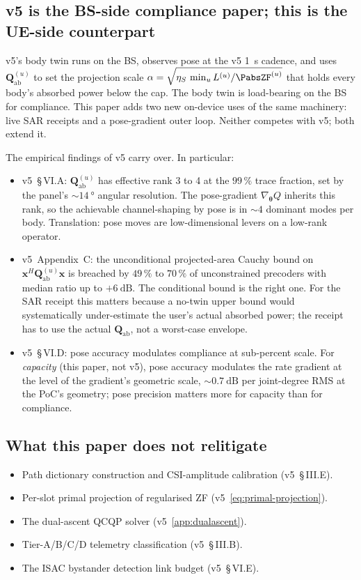 \documentclass[11pt,a4paper]{article}
\theoremstyle{definition}
\newcommand{\Qabs}{\mathbf{Q}_{\mathrm{ab}}}
\newcommand{\xvec}{\mathbf{x}}
\newcommand{\thetab}{\bm{\theta}}
\begin{document}
\subsection{v5 is the BS-side compliance paper; this is the UE-side
counterpart}

v5's body twin runs on the BS, observes pose at the v5 \SI{1}{\s}
cadence, and uses $\Qabs^{(u)}$ to set the projection scale
$\alpha=\sqrt{\eta_S\,\min_u L^{(u)}/\PabsZF^{(u)}}$ that holds
every body's absorbed power below the cap.  The body twin is
load-bearing on the BS for compliance.  This paper adds two new
on-device uses of the same machinery: live SAR receipts and a
pose-gradient outer loop.  Neither competes with v5; both extend
it.

The empirical findings of v5 carry over.  In particular:
\begin{itemize}[leftmargin=1.6em,itemsep=2pt]
\item v5~\S\,VI.A: $\Qabs^{(u)}$ has effective rank 3 to 4 at the
$99\,\%$ trace fraction, set by the panel's $\sim\SI{14}{\degree}$
angular resolution.  The pose-gradient $\nabla_\thetab Q$ inherits
this rank, so the achievable channel-shaping by pose is in $\sim 4$
dominant modes per body.  Translation: pose moves are
low-dimensional levers on a low-rank operator.
\item v5~Appendix~C: the unconditional projected-area Cauchy bound
on $\xvec^H\Qabs^{(u)}\xvec$ is breached by $49\,\%$ to $70\,\%$ of
unconstrained precoders with median ratio up to $+\SI{6}{\dB}$.
The conditional bound is the right one.  For the SAR receipt this
matters because a no-twin upper bound would systematically
under-estimate the user's actual absorbed power; the receipt has
to use the actual $\Qabs$, not a worst-case envelope.
\item v5~\S\,VI.D: pose accuracy modulates compliance at
sub-percent scale.  For \emph{capacity} (this paper, not v5), pose
accuracy modulates the rate gradient at the level of the
gradient's geometric scale, $\sim\SI{0.7}{\dB}$ per joint-degree
RMS at the PoC's geometry; pose precision matters more for
capacity than for compliance.
\end{itemize}

\subsection{What this paper does not relitigate}

\begin{itemize}[leftmargin=1.6em,itemsep=2pt]
\item Path dictionary construction and CSI-amplitude calibration
(v5~\S\,III.E).
\item Per-slot primal projection of regularised ZF
(v5~\cref{eq:primal-projection}).
\item The dual-ascent QCQP solver
(v5~\cref{app:dualascent}).
\item Tier-A/B/C/D telemetry classification (v5~\S\,III.B).
\item The ISAC bystander detection link budget (v5~\S\,VI.E).
\end{itemize}
\end{document}
